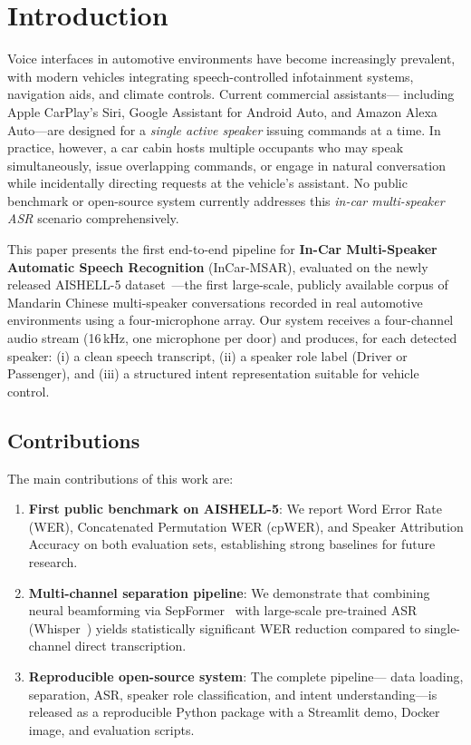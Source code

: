 
\section{Introduction}
\label{sec:intro}

Voice interfaces in automotive environments have become increasingly prevalent,
with modern vehicles integrating speech-controlled infotainment systems,
navigation aids, and climate controls. Current commercial assistants—
including Apple CarPlay's Siri, Google Assistant for Android Auto, and Amazon
Alexa Auto—are designed for a \emph{single active speaker} issuing commands
at a time. In practice, however, a car cabin hosts multiple occupants who may
speak simultaneously, issue overlapping commands, or engage in natural
conversation while incidentally directing requests at the vehicle's assistant.
No public benchmark or open-source system currently addresses this
\emph{in-car multi-speaker ASR} scenario comprehensively.

This paper presents the first end-to-end pipeline for \textbf{In-Car
Multi-Speaker Automatic Speech Recognition} (InCar-MSAR), evaluated on the
newly released AISHELL-5 dataset~\cite{aishell5_2025}—the first large-scale,
publicly available corpus of Mandarin Chinese multi-speaker conversations
recorded in real automotive environments using a four-microphone array. Our
system receives a four-channel audio stream (16\,kHz, one microphone per
door) and produces, for each detected speaker: (i) a clean speech
transcript, (ii) a speaker role label (Driver or Passenger), and (iii) a
structured intent representation suitable for vehicle control.

\subsection*{Contributions}
The main contributions of this work are:
\begin{enumerate}
    \item \textbf{First public benchmark on AISHELL-5}: We report
    Word Error Rate (WER), Concatenated Permutation WER (cpWER), and
    Speaker Attribution Accuracy on both evaluation sets, establishing
    strong baselines for future research.

    \item \textbf{Multi-channel separation pipeline}: We demonstrate that
    combining neural beamforming via SepFormer~\cite{subakan2021attention}
    with large-scale pre-trained ASR (Whisper~\cite{radford2023robust})
    yields statistically significant WER reduction compared to
    single-channel direct transcription.

    \item \textbf{Reproducible open-source system}: The complete pipeline—
    data loading, separation, ASR, speaker role classification, and intent
    understanding—is released as a reproducible Python package with a
    Streamlit demo, Docker image, and evaluation scripts.
\end{enumerate}

